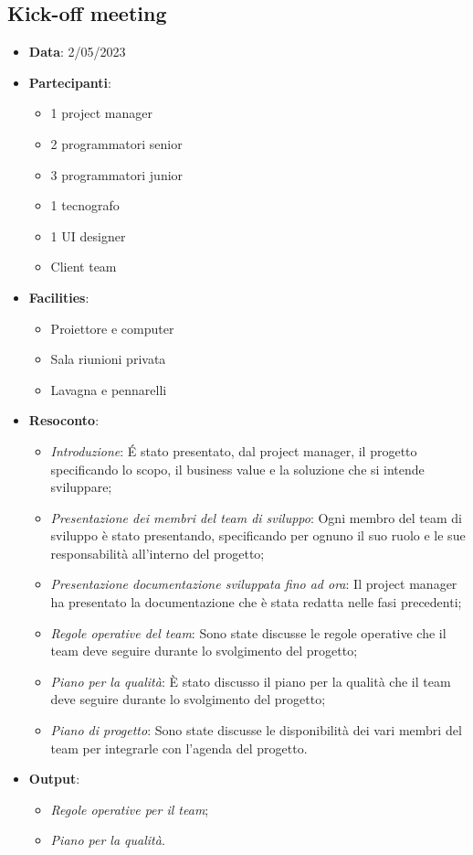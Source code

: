 \documentclass{article}
\begin{document}
  \subsection{Kick-off meeting}
  \begin{itemize}
    \item \textbf{Data}: 2/05/2023
    \item \textbf{Partecipanti}: 
    \begin{itemize}
      \item 1 project manager
      \item 2 programmatori senior
      \item 3 programmatori junior
      \item 1 tecnografo
      \item 1 UI designer
      \item Client team
    \end{itemize}
    \item \textbf{Facilities}:
    \begin{itemize}
      \item Proiettore e computer
      \item Sala riunioni privata
      \item Lavagna e pennarelli
    \end{itemize}
    \item \textbf{Resoconto}:
    \begin{itemize}
      \item \emph{Introduzione}:
        É stato presentato, dal project manager, il progetto specificando lo scopo, il business
          value e la soluzione che si intende sviluppare;
      \item \emph{Presentazione dei membri del team di sviluppo}: 
       Ogni membro del team di sviluppo è stato presentando, specificando per ognuno il suo ruolo
        e le sue responsabilità all'interno del progetto;
      \item \emph{Presentazione documentazione sviluppata fino ad ora}:
        Il project manager ha presentato la documentazione che è stata redatta nelle fasi precedenti;
      \item \emph{Regole operative del team}:
        Sono state discusse le regole operative che il team deve seguire durante lo svolgimento del progetto;
      \item \emph{Piano per la qualità}:
        È stato discusso il piano per la qualità che il team deve seguire durante lo svolgimento del progetto;
      \item \emph{Piano di progetto}:
        Sono state discusse le disponibilità dei vari membri del team per integrarle con l'agenda del progetto.
    \end{itemize}
    \item \textbf{Output}:
    \begin{itemize}
      \item \emph{Regole operative per il team};
      \item \emph{Piano per la qualità}.
    \end{itemize}
  \end{itemize}
\end{document}

